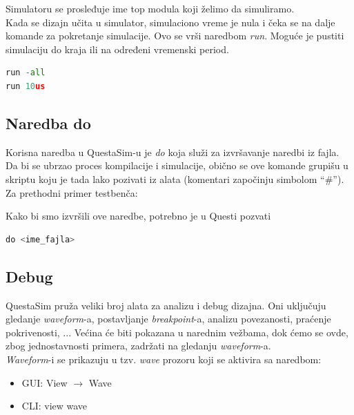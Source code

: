Simulatoru se prosleđuje ime top modula koji želimo da simuliramo.\\

Kada se dizajn učita u simulator, simulaciono vreme je nula i čeka se na dalje
komande za pokretanje simulacije.
Ovo se vrši naredbom \emph{run}.
Moguće je pustiti simulaciju do kraja ili na određeni vremenski period.

\begin{lstlisting}[language=Python]
run -all
run 10us
\end{lstlisting}


\subsection{Naredba do}

Korisna naredba u QuestaSim-u je \emph{do} koja služi za izvršavanje naredbi iz
fajla.
Da bi se ubrzao proces kompilacije i simulacije, obično se ove komande grupišu u
skriptu koju je tada lako pozivati iz alata (komentari započinju simbolom
``\(\#\)'').
Za prethodni primer testbenča:



Kako bi smo izvršili ove naredbe, potrebno je u Questi pozvati
\begin{lstlisting}[language=Python]
do <ime_fajla>
\end{lstlisting}


\subsection{Debug}

QuestaSim pruža veliki broj alata za analizu i debug dizajna.
Oni uključuju gledanje \emph{waveform}-a, postavljanje \emph{breakpoint}-a,
analizu povezanosti, praćenje pokrivenosti, ...
Većina će biti pokazana u narednim vežbama, dok ćemo se ovde, zbog
jednostavnosti primera, zadržati na gledanju \emph{waveform}-a.\\

\emph{Waveform}-i se prikazuju u tzv. \emph{wave} prozoru koji se aktivira sa
naredbom:
\begin{itemize}
\item GUI: View \(\rightarrow\) Wave
\item CLI: view wave
\end{itemize}


